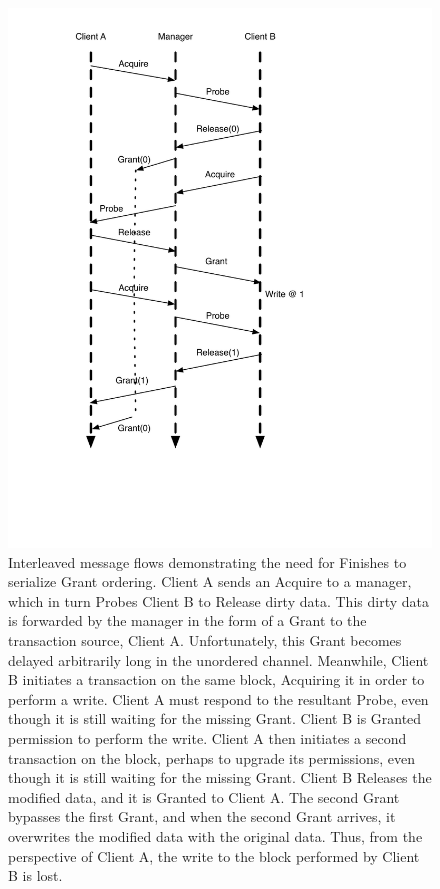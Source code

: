\begin{figure}[!p]
\centering
\includegraphics[width=0.5\columnwidth]{tilelink/figures/unordered.pdf}
\caption[Interleaved and disordered message flows.]{
Interleaved message flows demonstrating the need for Finishes to serialize Grant ordering.
Client A sends an Acquire to a manager, which in turn Probes Client B to Release dirty data.
This dirty data is forwarded by the manager in the form of a Grant to the transaction source, Client A.
Unfortunately, this Grant becomes delayed arbitrarily long in the unordered channel. 
Meanwhile, Client B initiates a transaction on the same block, Acquiring it in order to perform a write.
Client A must respond to the resultant Probe, even though it is still waiting for the missing Grant.
Client B is Granted permission to perform the write.
Client A then initiates a second transaction on the block, perhaps to upgrade its permissions, even though it is still waiting for the missing Grant.
Client B Releases the modified data, and it is Granted to Client A.
The second Grant bypasses the first Grant, and when the second Grant arrives, it overwrites the modified data with the original data.
Thus, from the perspective of Client A, the write to the block performed by Client B is lost.
}
\label{fig:unordered}
\end{figure}

